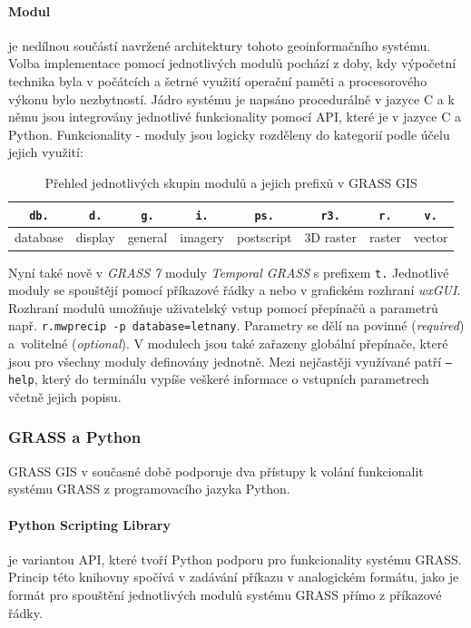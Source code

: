 \documentclass[a4paper,12pt,oneside]{report}
\begin{document}
\paragraph*{Modul} je nedílnou součástí navržené architektury tohoto
geoinformačního systému. Volba implementace pomocí jednotlivých modulů
pochází z doby, kdy výpočetní technika byla v počátcích a šetrné
využití operační paměti a procesorového výkonu bylo nezbytností. Jádro
systému je napsáno procedurálně v jazyce C a k němu jsou integrovány
jednotlivé funkcionality pomocí \acs{API}, které je v jazyce C a
Python. Funkcionality - moduly jsou logicky rozděleny do kategorií
podle účelu jejich využití:
\begin{table}[h]
\centering
\begin{tabular}{|cccccccc|}
\hline
{\tt db.} & {\tt d.} & {\tt g.} & {\tt i.} & {\tt ps.} & {\tt r3.} & {\tt r.} & {\tt v.} \\
\hline \hline
database & display & general & imagery & postscript & 3D raster & raster & vector \\ \hline
\end{tabular}
\caption{Přehled jednotlivých skupin modulů a jejich prefixů v GRASS GIS}
\label{tab:module}
\end{table}


Nyní také nově v \textit{GRASS 7} moduly \textit{Temporal GRASS} s
prefixem \texttt{t.} Jednotlivé moduly se spouštějí pomocí příkazové
řádky a nebo v grafickém rozhraní \textit{wxGUI}. Rozhraní modulů
umožňuje uživatelský vstup pomocí přepínačů a parametrů
např. \texttt{r.mwprecip -p database=letnany}. Parametry se dělí na
povinné (\textit{required}) a~volitelné (\textit{optional}). V
modulech jsou také zařazeny globální přepínače, které jsou pro všechny moduly
definovány jednotně. Mezi nejčastěji využívané patří \texttt{--help},
který do terminálu vypíše veškeré informace o vstupních parametrech
včetně jejich popisu.

\subsubsection*{GRASS a Python}
GRASS GIS v současné době podporuje dva přístupy k volání funkcionalit
systému GRASS z programovacího jazyka Python.
\paragraph*{Python Scripting Library} je variantou API, které tvoří
Python podporu pro funkcionality systému GRASS. Princip této knihovny spočívá
v zadávání příkazu v analogickém formátu, jako je formát pro spouštění
jednotlivých modulů systému GRASS přímo z příkazové řádky.
\end{document}
